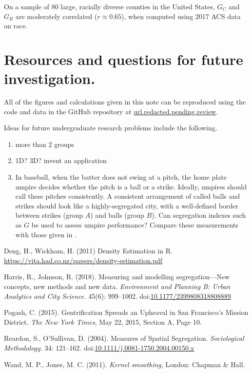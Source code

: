 \documentclass{article}
\theoremstyle{theorem}
\theoremstyle{definition}
\begin{document}
On a sample of 80 large, racially diverse counties in the United States, $G_C$ and $G_R$ are moderately correlated ($r \approx 0.65$), when computed using 2017 ACS data on race.

\section{Resources and questions for future investigation.}

All of the figures and calculations given in this note can be reproduced using the code and data in the GitHub repository at
\url{url.redacted.pending.review}.

Ideas for future undergraduate research problems include the following.

\begin{enumerate}
  \item more than 2 groups
  \item 1D? 3D? invent an application
  \item In baseball, when the batter does not swing at a pitch, the home plate umpire decides whether the pitch is a ball or a strike. Ideally, umpires should call these pitches consistently. A consistent arrangement of called balls and strikes should look like a highly-segregated city, with a well-defined border between strikes (group $A$) and balls (group $B$). Can segregation indexes such as $G$ be used to assess umpire performance? Compare these measurements with those given in \cite{hunter18}.

\end{enumerate}

\begin{thebibliography}{3}

 Deng, H., Wickham, H. (2011) Density Estimation in R. \href{https://vita.had.co.nz/papers/density-estimation.pdf}{\url{https://vita.had.co.nz/papers/density-estimation.pdf}}

Harris, R., Johnson, R. (2018). Measuring and modelling segregation---New concepts, new methods and new data. \textit{Environment and Planning B: Urban Analytics and City Science.} 45(6): 999--1002. doi:\href{http://dx.doi.org/10.1177/2399808318808889}{10.1177/2399808318808889}

Pogash, C. (2015). Gentrification Spreads an Upheaval in San Francisco's Mission District. \textit{The New York Times}, May 22, 2015, Section A, Page 10.

Reardon, S., O'Sullivan, D. (2004). Measures of Spatial Segregation. \textit{Sociological Methodology.} 34: 121--162. doi:\href{http://dx.doi.org/10.1111/j.0081-1750.2004.00150.x}{10.1111/j.0081-1750.2004.00150.x}

 Wand, M. P., Jones, M. C. (2011). \textit{Kernel smoothing}, London: Chapman \& Hall.

\end{thebibliography}
\end{document}

